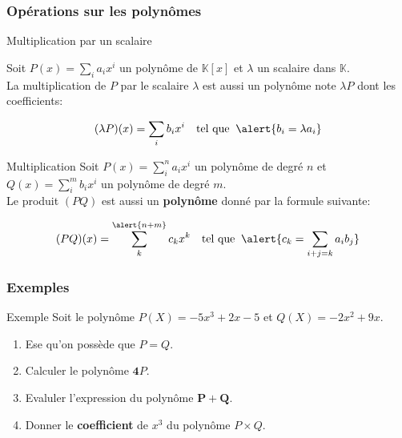 \documentclass{beamer}
\newcommand{\setK}{\mathbb{K}}
\begin{document}
\begin{frame}[t]
  \frametitle{Opérations sur les polynômes}

  \begin{block}{Multiplication par un scalaire}
    
    Soit $P(x)= \sum_i a_i x^i$ un polynôme de $\setK[x]$ et $\lambda$ un
    scalaire dans $\setK$.\\[4pt]

    La multiplication de $P$ par le scalaire $\lambda$ est aussi un polynôme
    note $\lambda P$ dont les coefficients:

    \begin{equation}
      (\lambda P)(x) = \sum_i b_i x^i  \quad\text{tel que}\;\;
      \alert{b_i = \lambda a_i}
    \end{equation}
  \end{block}
\pause

  \begin{block}{Multiplication}
    \small
    Soit $P(x)=\sum_i^n a_i x^i$ un polynôme de degré $n$ et $Q(x)=\sum_i^m b_i
    x^i$ un polynôme de degré $m$.\\[4pt]

    Le produit $(PQ)$ est aussi un \textbf{polynôme} donné par la formule
    suivante:

    \begin{equation}
      (PQ)(x) = \sum_k^{\alert{n+m}}c_k x^k \quad \text{tel que}\;\; \alert{c_k=
      \sum_{i+j=k} a_ib_j}
    \end{equation}



  \end{block}
  
\end{frame}

\begin{frame}[<+->]
  \frametitle{Exemples}
 \begin{block}{Exemple}
   Soit le polynôme $P(X)= -5x^3 + 2x -5$ et $Q(X) = -2x^2+ 9x$.\\[8pt]
   \begin{enumerate}
     \item Ese qu'on possède que $P = Q$.\\[4pt]
       \item Calculer le polynôme $\mathbf{4} P$.\\[4pt]
     \item Evaluler l'expression du polynôme $\mathbf{P + Q}$.\\[4pt]
     \item Donner le \textbf{coefficient } de $x^3$ du polynôme $P\times
       Q$.\\[4pt]
   \end{enumerate}
 \end{block} 

\end{frame}
\end{document}
